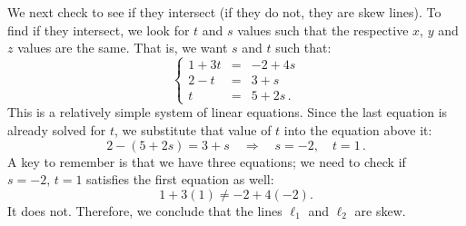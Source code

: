 \begin{example}
We next check to see if they intersect (if they do not, they are skew lines). To find if they intersect, we look for $t$ and $s$ values such that the respective $x$, $y$ and $z$ values are the same. That is, we want $s$ and $t$ such that:
$$\left\{
\begin{array}{rcl}
1+3t &=&-2+4s\\
2-t&=&3+s\\
t&=&5+2s\,.\end{array}
\right.$$
This is a relatively simple system of linear equations. Since the last equation is already solved for $t$, we substitute that value of $t$ into the equation above it:
$$2-(5+2s) = 3+s \quad \Rightarrow \quad s=-2,\quad t=1\,.$$
A key to remember is that we have three equations; we need to check if $s=-2,\, t=1$ satisfies the first equation as well:
$$1+3(1) \neq -2+4(-2).$$
It does not. Therefore, we conclude that the lines $\ell_1$ and $\ell_2$ are skew.
\end{example}

